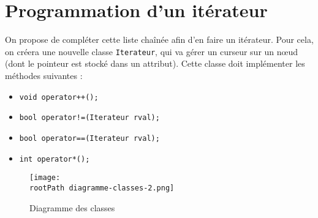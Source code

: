 \documentclass[abstracton]{scrartcl}
\newcommand*{\rootPath}{../}
\begin{document}
\lstset{language=C++}




\section{Programmation d'un itérateur}
\label{sec:exploration}



On propose de compléter cette liste chaînée afin d'en faire un itérateur. Pour cela, on créera une nouvelle classe \lstinline{Iterateur}, qui va gérer un curseur sur un nœud (dont le pointeur est stocké dans un attribut). Cette classe doit implémenter les méthodes suivantes :
\begin{itemize}
    \item \lstinline{void operator++();}
	\item \lstinline{bool operator!=(Iterateur rval);}
	\item \lstinline{bool operator==(Iterateur rval);}
	\item \lstinline{int operator*();}
\end{itemize}



\begin{figure}
	\centering
	\texttt{[image: \\rootPath diagramme-classes-2.png]}
	\caption{Diagramme des classes}
	\label{fig:d-c2}
\end{figure}







\Ans{}
\end{document}
